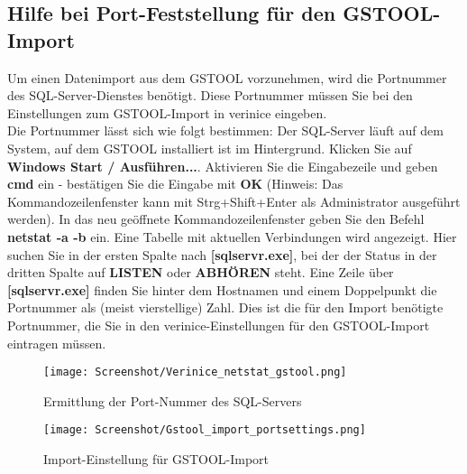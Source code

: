 \documentclass[a4paper,10pt]{book}
\begin{document}
\subsection{Hilfe bei Port-Feststellung für den GSTOOL-Import}
Um einen Datenimport aus dem \textsc{GSTOOL} vorzunehmen, wird die Portnummer des SQL-Server-Dienstes benötigt. Diese Portnummer müssen Sie bei den
Einstellungen zum \textsc{GSTOOL}-Import in verinice eingeben.
\newline\\
Die Portnummer lässt sich wie folgt bestimmen: Der SQL-Server läuft auf dem System, auf dem \textsc{GSTOOL} installiert ist im Hintergrund.
Klicken Sie auf \textbf{Windows Start / Ausführen...}. Aktivieren Sie die Eingabezeile und geben \textbf{cmd} ein - bestätigen Sie die Eingabe mit
\textbf{OK} (Hinweis: Das Kommandozeilenfenster kann mit Strg+Shift+Enter als Administrator ausgeführt werden). In das neu geöffnete Kommandozeilenfenster
geben Sie den Befehl \textbf{netstat -a -b} ein. Eine Tabelle mit aktuellen Verbindungen wird angezeigt. Hier suchen Sie in der ersten Spalte nach
\textbf{[sqlservr.exe]}, bei der der Status in der dritten Spalte auf \textbf{LISTEN} oder \textbf{ABHÖREN} steht. Eine Zeile über \textbf{[sqlservr.exe]}
finden Sie hinter dem Hostnamen und einem Doppelpunkt die Portnummer als (meist vierstellige) Zahl. Dies ist die für den Import benötigte Portnummer,
die Sie in den verinice-Einstellungen für den \textsc{GSTOOL}-Import eintragen müssen.
\newline
\begin{figure}[htb!]
  \centering
  \texttt{[image: Screenshot/Verinice\_netstat\_gstool.png]}
  \caption{\label{Ermittlung der Port-Nummer des SQL-Servers} Ermittlung der Port-Nummer des SQL-Servers}
\end{figure}
\newline
\begin{figure}[htb!]
  \centering
  \texttt{[image: Screenshot/Gstool\_import\_portsettings.png]}
  \caption{\label{Import-Einstellung fuer GSTOOL-Import} Import-Einstellung für GSTOOL-Import}
\end{figure}
\newline
\end{document}
